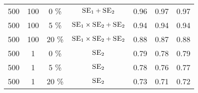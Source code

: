 \documentclass[twoside]{article}
\begin{document}
\begin{table*}[ht!]
\begin{center}
{\begin{tabular}{|c c  c | c |  c | c c| }
\hline  500    &   100  &  0 \%   &    $\textsc{SE}_1 + \textsc{SE}_2 $   &    0.96  &  0.97 & 0.97 \\
	500    &   100  &  5 \%   &    $\textsc{SE}_1 \times \textsc{SE}_2 + \textsc{SE}_2 $   &    0.94  &  0.94 & 0.94 \\
	500    &   100  &  20 \%   &    $\textsc{SE}_1 \times \textsc{SE}_2 + \textsc{SE}_2 $   &    0.88  &  0.87 & 0.88 \\ 
	500    &   1  &  0 \%   &    $\textsc{SE}_2 $   &    0.79  &  0.78 & 0.79    \\
	500    &   1  &  5 \%   &   $ \textsc{SE}_2 $   &    0.78  &  0.76 & 0.77    \\
	500    &   1  &  20 \%   &    $ \textsc{SE}_2 $  &    0.73  &  0.71 & 0.72 \\

\hline
\end{tabular}
}
\end{center}
\end{table*}
\end{document}
